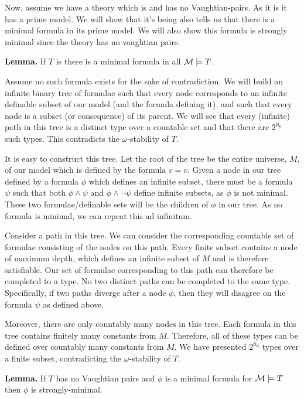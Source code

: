 Now, assume we have a theory which is \omst and has no Vaughtian-pairs. 
As it is \omst it has a prime model.
We will show that it's being \omst also tells us that there is a minimal formula in its prime model.
We will also show this formula is strongly minimal since the theory has no vaughtian pairs. 

\textbf{Lemma.} If \(T\) is \omst there is a minimal formula in all \(\mathcal{M} \models T\).

Assume no such formula exists for the sake of contradiction. 
We will build an infinite binary tree of formulae such that 
every node corresponds to an infinite definable subset of our model (and the formula defining it), 
and such that every node is a subset (or consequence) of its parent. 
We will see that every (infinite) path in this tree is a distinct type over a countable set and that there are \(2^{\aleph_0}\) such types. 
This contradicts the \(\omega\)-stability of \(T\).

It is easy to construct this tree. Let the root of the tree be the entire universe, \(M\), of our model which is defined by the formula \(v = v\).
Given a node in our tree defined by a formula \(\phi\) which defines an infinite subset, there must be a formula \(\psi\) such that both \(\phi \land \psi\) and \(\phi \land \neg \psi\) define infinite subsets, as \(\phi\) is not minimal. 
These two formulae/definable sets will be the children of \(\phi\) in our tree. 
As no formula is minimal, we can repeat this ad infinitum. 

Consider a path in this tree. We can consider the corresponding countable set of formulae consisting of the nodes on this path. 
Every finite subset contains a node of maximum depth, which defines an infinite subset of \(M\) and is therefore satisfiable. 
Our set of formulae corresponding to this path can therefore be completed to a type.
No two distinct paths can be completed to the same type. 
Specifically, if two paths diverge after a node \(\phi\), then they will disagree on the formula \(\psi\) as defined above. 

Moreover, there are only countably many nodes in this tree. 
Each formula in this tree contains finitely many constants from \(M\).
Therefore, all of these types can be defined over countably many constants from \(M\). 
We have presented \(2^{\aleph_0}\) types over a finite subset, contradicting the \(\omega\)-stability of \(T\).

\textbf{Lemma.} If \(T\) has no Vaughtian pairs and \(\phi\) is a minimal formula for \(\mathcal{M} \models T\) then \(\phi\) is strongly-minimal. 

